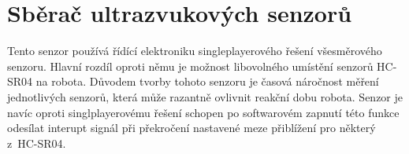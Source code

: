 \section{Sběrač ultrazvukových senzorů}\label{Sberac}
Tento senzor používá řídící elektroniku singleplayerového řešení všesměrového senzoru.
Hlavní rozdíl oproti němu je možnost libovolného umístění senzorů HC-SR04 na robota.
Důvodem tvorby tohoto senzoru je časová náročnost měření jednotlivých senzorů, která může razantně ovlivnit reakční dobu robota.
Senzor je navíc oproti singlplayerovému řešení schopen po softwarovém zapnutí této funkce odesílat interupt signál při překročení nastavené meze přiblížení pro některý z~HC-SR04.